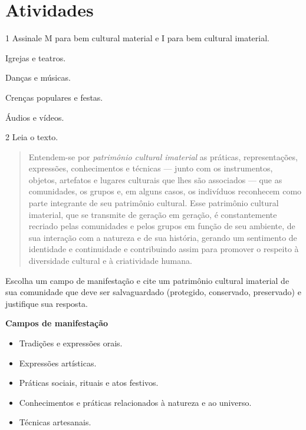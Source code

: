 \section{Atividades}

\num{1} Assinale M para bem cultural material e I para bem cultural imaterial.

\begin{multicols}{2}
\begin{boxlist}
 Igrejas e teatros. 

 Danças e músicas. 

 Crenças populares e festas. 

 Áudios e vídeos. 
\end{boxlist}
\end{multicols}

\num{2}  Leia o texto.

\begin{quote}
Entendem-se por \emph{patrimônio cultural imaterial} as práticas,
representações, expressões, conhecimentos e técnicas --- junto com os
instrumentos, objetos, artefatos e lugares culturais que lhes são
associados --- que as comunidades, os grupos e, em alguns casos, os
indivíduos reconhecem como parte integrante de seu patrimônio cultural.
Esse patrimônio cultural imaterial, que se transmite de geração em
geração, é constantemente recriado pelas comunidades e pelos grupos em função
de seu ambiente, de sua interação com a natureza e de sua história,
gerando um sentimento de identidade e continuidade e contribuindo assim
para promover o respeito à diversidade cultural e à criatividade humana.

\end{quote}

Escolha um campo de manifestação e cite um patrimônio cultural imaterial
de sua comunidade que deve ser salvaguardado (protegido, conservado,
preservado) e justifique sua resposta.

\textbf{Campos de manifestação}

\begin{itemize}
\item Tradições e expressões orais.

\item Expressões artísticas.

\item Práticas sociais, rituais e atos festivos.

\item Conhecimentos e práticas relacionados à natureza e ao universo.

\item Técnicas artesanais.
\end{itemize}

